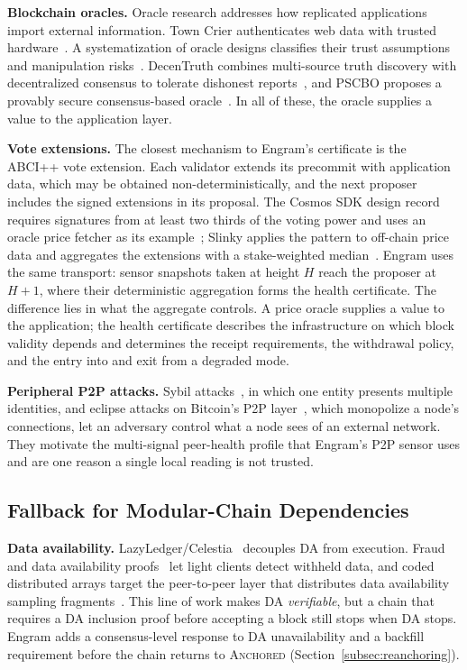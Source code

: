 \textbf{Blockchain oracles.}
Oracle research addresses how replicated applications import external
information. Town Crier authenticates web data with trusted
hardware~\cite{zhang2016towncrier}. A systematization of oracle designs
classifies their trust assumptions and manipulation
risks~\cite{eskandari2021oraclesok}. DecenTruth combines multi-source truth
discovery with decentralized consensus to tolerate dishonest
reports~\cite{xiao2023decentruth}, and PSCBO proposes a provably secure consensus-based
oracle~\cite{yao2025pscbo}. In all of these, the oracle supplies a value
to the application layer.

\textbf{Vote extensions.}
The closest mechanism to Engram's certificate is the ABCI++ vote extension.
Each validator extends its precommit with application data, which may be
obtained non-deterministically, and the next proposer includes the signed
extensions in its proposal. The Cosmos SDK design record requires signatures
from at least two thirds of the voting power and uses an oracle price fetcher
as its example~\cite{cosmos_adr064}; Slinky applies the pattern to off-chain
price data and aggregates the extensions with a stake-weighted
median~\cite{slinky_oracle}. Engram uses the same transport: sensor snapshots
taken at height $H$ reach the proposer at $H{+}1$, where their deterministic
aggregation forms the health certificate. The difference lies in what the
aggregate controls. A price oracle supplies a value to the application; the
health certificate describes the infrastructure on which block validity
depends and determines the receipt requirements, the withdrawal policy, and
the entry into and exit from a degraded mode.

\textbf{Peripheral P2P attacks.}
Sybil attacks~\cite{douceur2002sybil}, in which one entity presents multiple
identities, and eclipse attacks on Bitcoin's P2P
layer~\cite{heilman2015eclipse,rehman2025eclipse}, which monopolize a node's
connections, let an adversary control what a node sees of an external network. They motivate the multi-signal peer-health
profile that Engram's P2P sensor uses and are one reason a single local reading
is not trusted.

\subsection{Fallback for Modular-Chain Dependencies}
\label{subsec:settlement}
\textbf{Data availability.}
LazyLedger/Celestia~\cite{albassam2019lazyledger} decouples DA from execution.
Fraud and data availability proofs~\cite{albassam2021fraud} let light clients
detect withheld data, and coded distributed arrays target the peer-to-peer layer that
distributes data availability sampling fragments~\cite{phamminh2026cda}. This line of work makes DA
\emph{verifiable}, but a chain that requires a DA inclusion proof before
accepting a block still stops when DA stops. Engram adds a consensus-level
response to DA unavailability and a backfill requirement before the chain
returns to \textsc{Anchored} (Section~\ref{subsec:reanchoring}).

